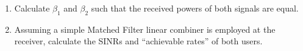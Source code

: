 \documentclass[a4paper,10pt]{article}
\begin{document}
\begin{enumerate}
 \item Calculate $\beta_1$ and $\beta_2$ such that the received powers of both signals are equal.
 \item Assuming a simple Matched Filter linear combiner is employed at the receiver, calculate the SINRs and ``achievable rates'' of both users. 
\end{enumerate}


%     
\end{document}
